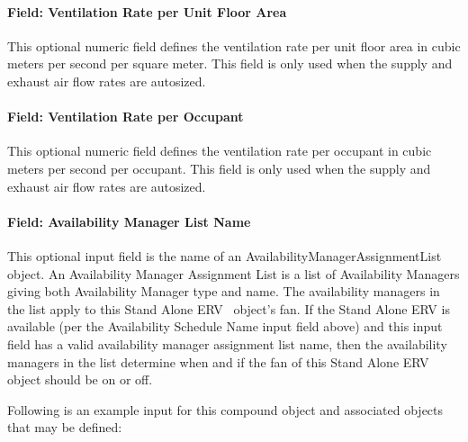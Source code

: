 \paragraph{Field: Ventilation Rate per Unit Floor Area}\label{field-ventilation-rate-per-unit-floor-area}

This optional numeric field defines the ventilation rate per unit floor area in cubic meters per second per square meter. This field is only used when the supply and exhaust air flow rates are autosized.

\paragraph{Field: Ventilation Rate per Occupant}\label{field-ventilation-rate-per-occupant}

This optional numeric field defines the ventilation rate per occupant in cubic meters per second per occupant. This field is only used when the supply and exhaust air flow rates are autosized.

\paragraph{Field: Availability Manager List Name}\label{field-availability-manager-list-name-9}

This optional input field is the name of an AvailabilityManagerAssignmentList object. An Availability Manager Assignment List is a list of Availability Managers giving both Availability Manager type and name. The availability managers in the list apply to this Stand Alone ERV~ object's fan. If the Stand Alone ERV is available (per the Availability Schedule Name input field above) and this input field has a valid availability manager assignment list name, then the availability managers in the list determine when and if the fan of this Stand Alone ERV~ object should be on or off.

Following is an example input for this compound object and associated objects that may be defined:

